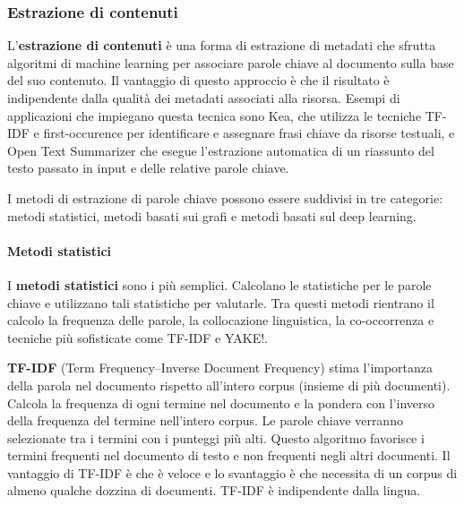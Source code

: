 \subsubsection{Estrazione di contenuti}
L'\textbf{estrazione di contenuti} è una forma di estrazione di metadati che sfrutta algoritmi di machine learning per associare parole chiave al documento sulla base del suo contenuto. Il vantaggio di questo approccio è che il risultato è indipendente dalla qualità dei metadati associati alla risorsa. Esempi di applicazioni che impiegano questa tecnica sono Kea, che utilizza le tecniche TF-IDF e first-occurence per identificare e assegnare frasi chiave da risorse testuali, e Open Text Summarizer che esegue l'estrazione automatica di un riassunto del testo passato in input e delle relative parole chiave. 

I metodi di estrazione di parole chiave possono essere suddivisi in tre categorie: metodi statistici, metodi basati sui grafi e metodi basati sul deep learning\cite{extraction}.

\paragraph{Metodi statistici}
I \textbf{metodi statistici} sono i più semplici. Calcolano le statistiche per le parole chiave e utilizzano tali statistiche per valutarle. Tra questi metodi rientrano il calcolo la frequenza delle parole, la collocazione linguistica, la co-occorrenza e tecniche più sofisticate come TF-IDF e YAKE!.

\textbf{TF-IDF} (Term Frequency–Inverse Document Frequency) stima l'importanza della parola nel documento rispetto all'intero corpus (insieme di più documenti). Calcola la frequenza di ogni termine nel documento e la pondera con l'inverso della frequenza del termine nell'intero corpus. Le parole chiave verranno selezionate tra i termini con i punteggi più alti. Questo algoritmo favorisce i termini frequenti nel documento di testo e non frequenti negli altri documenti. Il vantaggio di TF-IDF è che è veloce e lo svantaggio è che necessita di un corpus di almeno qualche dozzina di documenti. TF-IDF è indipendente dalla lingua.


